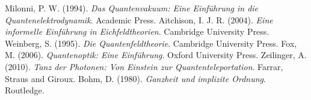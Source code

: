 \documentclass[a4paper,12pt]{article}
\theoremstyle{definition}
\theoremstyle{remark}
\begin{document}
\begin{thebibliography}{99}
		 Milonni, P. W. (1994). \textit{Das Quantenvakuum: Eine Einführung in die Quantenelektrodynamik}. Academic Press.
		 Aitchison, I. J. R. (2004). \textit{Eine informelle Einführung in Eichfeldtheorien}. Cambridge University Press.
		 Weinberg, S. (1995). \textit{Die Quantenfeldtheorie}. Cambridge University Press.
		 Fox, M. (2006). \textit{Quantenoptik: Eine Einführung}. Oxford University Press.
		 Zeilinger, A. (2010). \textit{Tanz der Photonen: Von Einstein zur Quantenteleportation}. Farrar, Straus and Giroux.
		 Bohm, D. (1980). \textit{Ganzheit und implizite Ordnung}. Routledge.
	\end{thebibliography}
	
\end{document}
